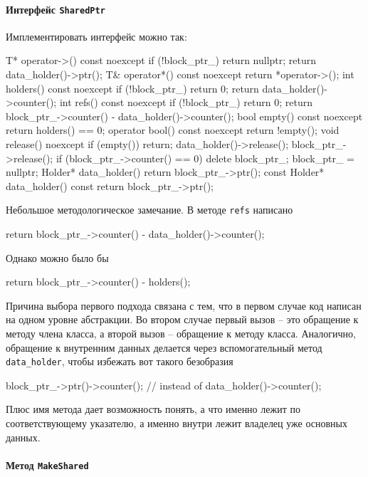 \paragraph{Интерфейс \texttt{SharedPtr}}

Имплементировать интерфейс можно так:
\begin{cppcode}
T* operator->() const noexcept {
  if (!block_ptr_)
    return nullptr;
  return data_holder()->ptr();
}
T& operator*() const noexcept {
  return *operator->();
}
int holders() const noexcept {
  if (!block_ptr_)
    return 0;
  return data_holder()->counter();
}
int refs() const noexcept {
  if (!block_ptr_)
    return 0;
  return block_ptr_->counter() - data_holder()->counter();
}
bool empty() const noexcept {
  return holders() == 0;
}
operator bool() const noexcept {
  return !empty();
}
void release() noexcept {
  if (empty())
    return;
  data_holder()->release();
  block_ptr_->release();
  if (block_ptr_->counter() == 0) {
    delete block_ptr_;
  }
  block_ptr_ = nullptr;
}
Holder* data_holder() {
  return block_ptr_->ptr();
}
const Holder* data_holder() const {
  return block_ptr_->ptr();
}
\end{cppcode}
Небольшое методологическое замечание.
В методе \verb"refs" написано
\begin{cppcode}[numbers = none]
return block_ptr_->counter() - data_holder()->counter();
\end{cppcode}
Однако можно было бы
\begin{cppcode}[numbers = none]
return block_ptr_->counter() - holders();
\end{cppcode}
Причина выбора первого подхода связана с тем, что в первом случае код написан на одном уровне абстракции.
Во втором случае первый вызов -- это обращение к методу члена класса, а второй вызов -- обращение к методу класса.
Аналогично, обращение к внутренним данных делается через вспомогательный метод \verb"data_holder", чтобы избежать вот такого безобразия
\begin{cppcode}[numbers = none]
block_ptr_->ptr()->counter();
// instead of
data_holder()->counter();
\end{cppcode}
Плюс имя метода дает возможность понять, а что именно лежит по соответствующему указателю, а именно внутри лежит владелец уже основных данных.

\paragraph{Метод \texttt{MakeShared}}


